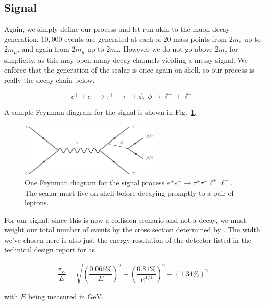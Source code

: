 \subsection{Signal}
Again, we simply define our process and let \madgraph run akin to the muon decay generation.
$10,000$ events are generated at each of $20$ mass points from $2m_e$ up to $2m_\mu$, and again from $2m_\mu$ up to $2m_\tau$.
However we do not go above $2m_\tau$ for simplicity, as this may open many decay channels yielding a messy signal.
We enforce that the generation of the scalar is once again on-shell, so our process is really the decay chain below.

\begin{equation}
    e^+ + e^- \rightarrow \tau^+ + \tau^- + \phi,~\phi \rightarrow \ell^+ + \ell^-
\end{equation}

A sample Feynman diagram for the signal is shown in Fig.\ \ref{fig:ee_tautaull_scalar}.

\begin{figure}[h]
    \centering
    \includegraphics[width=0.6\textwidth]{Figures/feynman_diagrams/ee_tautaull_scalar}
    \caption{One Feynman diagram for the signal process $e^+ e^- \rightarrow \tau^+ \tau^- \ell^+ \ell^-$. The scalar must live on-shell before decaying promptly to a pair of leptons.}
    \label{fig:ee_tautaull_scalar}
\end{figure}

For our signal, since this is now a collision scenario and not a decay, we must weight our total number of events by the cross section determined by \madgraph.
The width we've chosen here is also just the energy resolution of the detector listed in the technical design report for \belleii \cite{Abe:2010gxa} as

\begin{equation}
    \frac{\sigma_E}{E} = \sqrt{\left(\frac{0.066\%}{E}\right)^2 + \left(\frac{0.81\%}{E^{1/4}}\right)^2 + \left(1.34\%\right)^2}
\end{equation}

\noindent with $E$ being measured in $\textrm{GeV}$.

